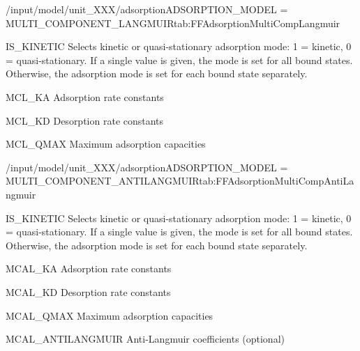 \begin{condsubgroup}{/input/model/unit\_XXX/adsorption}{ADSORPTION\_MODEL = MULTI\_COMPONENT\_LANGMUIR}{tab:FFAdsorptionMultiCompLangmuir}
  \begin{dataset}[type=int,range={$\{ 0,1 \}$},length={1 / \texttt{NTOTALBND}}]{IS\_KINETIC}
    Selects kinetic or quasi-stationary adsorption mode: 1 = kinetic, 0 = quasi-stationary.
    If a single value is given, the mode is set for all bound states.
    Otherwise, the adsorption mode is set for each bound state separately.
  \end{dataset}
  \begin{dataset}[type=double,range={$\geq 0$},length={\texttt{NCOMP}}]{MCL\_KA}
    Adsorption rate constants
  \end{dataset}
  \begin{dataset}[unit=\si{\per\second}, type=double,range={$\geq 0$},length={\texttt{NCOMP}}]{MCL\_KD}
    Desorption rate constants
  \end{dataset}
  \begin{dataset}[unit=\si{\mol\per\cubic\metre\of{SP}}, type=double,range={$> 0$},length={\texttt{NCOMP}}]{MCL\_QMAX}
    Maximum adsorption capacities
  \end{dataset}
\end{condsubgroup}

\begin{condsubgroup}{/input/model/unit\_XXX/adsorption}{ADSORPTION\_MODEL = MULTI\_COMPONENT\_ANTILANGMUIR}{tab:FFAdsorptionMultiCompAntiLangmuir}
  \begin{dataset}[type=int,range={$\{ 0,1 \}$},length={1 / \texttt{NTOTALBND}}]{IS\_KINETIC}
    Selects kinetic or quasi-stationary adsorption mode: 1 = kinetic, 0 = quasi-stationary.
    If a single value is given, the mode is set for all bound states.
    Otherwise, the adsorption mode is set for each bound state separately.
  \end{dataset}
  \begin{dataset}[unit=\si{\cubic\metre\of{MP}\per\mol\per\second}, type=double,range={$\geq 0$},length={\texttt{NCOMP}}]{MCAL\_KA}
    Adsorption rate constants
  \end{dataset}
  \begin{dataset}[unit=\si{\per\second}, type=double,range={$\geq 0$},length={\texttt{NCOMP}}]{MCAL\_KD}
    Desorption rate constants
  \end{dataset}
  \begin{dataset}[unit=\si{\mol\per\cubic\metre\of{SP}}, type=double,range={$> 0$},length={\texttt{NCOMP}}]{MCAL\_QMAX}
    Maximum adsorption capacities
  \end{dataset}
  \begin{dataset}[unit=\si{\mol\per\cubic\metre\of{SP}}, type=double,range={$\{ -1, 1\}$},length={\texttt{NCOMP}}]{MCAL\_ANTILANGMUIR}
    Anti-Langmuir coefficients (optional)
  \end{dataset}
\end{condsubgroup}

